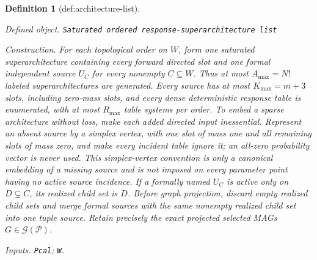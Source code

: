\documentclass{article}
\newtheorem{definition}{Definition}
\begin{document}
\begin{definition}[def:architecture-list]\label{def:architecture-list}
\par\smallskip\noindent\emph{Defined object.} \texttt{Saturated ordered response-\allowbreak{}superarchitecture list}
\par\smallskip\noindent\emph{Construction.} For each topological order on \(W\), form one saturated superarchitecture containing every forward directed slot and one formal independent source \(U_C\) for every nonempty \(C\subseteq W\).  Thus at most \(A_{\max}=N!\) labeled superarchitectures are generated.  Every source has at most \(K_{\max}=m+3\) slots, including zero-mass slots, and every dense deterministic response table is enumerated, with at most \(R_{\max}\) table systems per order.  To embed a sparse architecture without loss, make each added directed input inessential.  Represent an absent source by a simplex vertex, with one slot of mass one and all remaining slots of mass zero, and make every incident table ignore it; an all-zero probability vector is never used.  This simplex-vertex convention is only a canonical embedding of a missing source and is not imposed on every parameter point having no active source incidence.  If a formally named \(U_C\) is active only on \(D\subsetneq C\), its realized child set is \(D\).  Before graph projection, discard empty realized child sets and merge formal sources with the same nonempty realized child set into one tuple source.  Retain precisely the exact projected selected MAGs \(G\in\mathcal G(\mathcal P)\).
\par\smallskip\noindent\emph{Inputs.} \texttt{Pcal}; \texttt{W}.
\end{definition}
\end{document}
